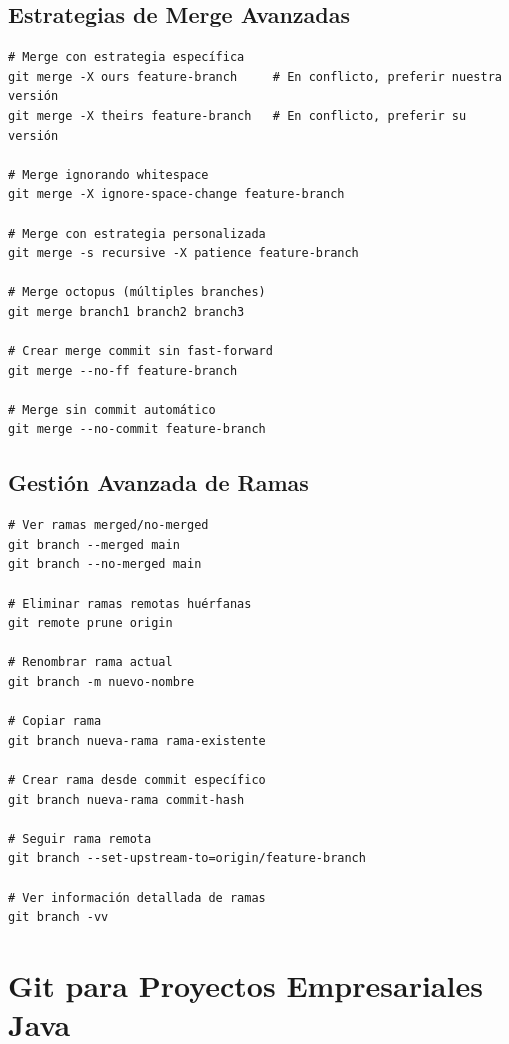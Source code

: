 \documentclass[12pt,a4paper]{article}
\begin{document}
\subsection{Estrategias de Merge Avanzadas}
\begin{lstlisting}[caption=Estrategias de merge personalizadas]
# Merge con estrategia específica
git merge -X ours feature-branch     # En conflicto, preferir nuestra versión
git merge -X theirs feature-branch   # En conflicto, preferir su versión

# Merge ignorando whitespace
git merge -X ignore-space-change feature-branch

# Merge con estrategia personalizada
git merge -s recursive -X patience feature-branch

# Merge octopus (múltiples branches)
git merge branch1 branch2 branch3

# Crear merge commit sin fast-forward
git merge --no-ff feature-branch

# Merge sin commit automático
git merge --no-commit feature-branch
\end{lstlisting}

\subsection{Gestión Avanzada de Ramas}
\begin{lstlisting}[caption=Operaciones complejas con ramas]
# Ver ramas merged/no-merged
git branch --merged main
git branch --no-merged main

# Eliminar ramas remotas huérfanas
git remote prune origin

# Renombrar rama actual
git branch -m nuevo-nombre

# Copiar rama
git branch nueva-rama rama-existente

# Crear rama desde commit específico
git branch nueva-rama commit-hash

# Seguir rama remota
git branch --set-upstream-to=origin/feature-branch

# Ver información detallada de ramas
git branch -vv
\end{lstlisting}

\section{Git para Proyectos Empresariales Java}
\end{document}
